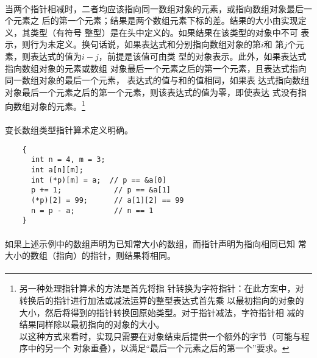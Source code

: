 {\paragraph{}
当两个指针相减时，二者均应该指向同一数组对象的元素，或指向数组对象最后一个元素之
后的第一个元素；结果是两个数组元素下标的差。结果的大小由实现定义，其类型（有符号
整型）是在头中定义的。如果结果在该类型的对象中不可
表示，则行为未定义。换句话说，如果表达式和分别指向数组对象的第$i$和
第$j$个元素，则表达式的值为${i-j}$，前提是该值可由类
型的对象表示。此外，如果表达式指向数组对象的元素或数组
对象最后一个元素之后的第一个元素，且表达式指向同一数组对象的最后一个元素，
表达式的值与和的值相同，如果表
达式指向数组对象最后一个元素之后的第一个元素，则该表达式的值为零，即使表达
式没有指向数组对象的元素。\footnote{另一种处理指针算术的方法是首先将指
针转换为字符指针：在此方案中，对转换后的指针进行加法或减法运算的整型表达式首先乘
以最初指向的对象的大小，然后将得到的指针转换回原始类型。对于指针减法，字符指针相
减的结果同样除以最初指向的对象的大小。\\
以这种方式来看时，实现只需要在对象结束后提供一个额外的字节（可能与程序中的另一个
对象重叠），以满足``最后一个元素之后的第一个''要求。}

\paragraph{}
\ex 变长数组类型指针算术定义明确。
\begin{lstlisting}
    {
      int n = 4, m = 3;
      int a[n][m];
      int (*p)[m] = a;  // p == &a[0]
      p += 1;            // p == &a[1]
      (*p)[2] = 99;      // a[1][2] == 99
      n = p - a;         // n == 1
    }
\end{lstlisting}

\paragraph{}
如果上述示例中的数组声明为已知常大小的数组，而指针声明为指向相同已知
常大小的数组（指向）的指针，则结果将相同。


\pagebreak
\syntax
\paragraph{}

}
